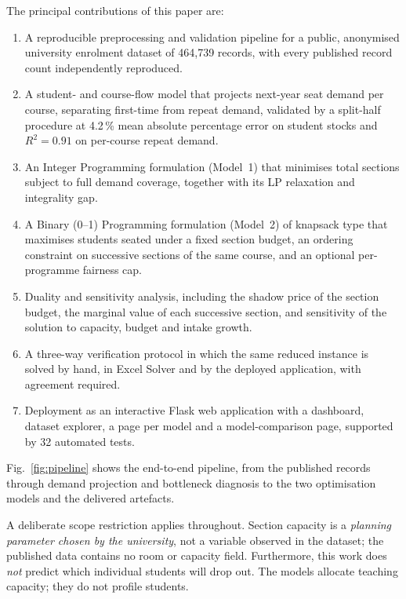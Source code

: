 \documentclass[conference]{IEEEtran}
\begin{document}
The principal contributions of this paper are:
\begin{enumerate}
\item A reproducible preprocessing and validation pipeline for a public, anonymised
      university enrolment dataset of 464{,}739 records, with every published record
      count independently reproduced.
\item A student- and course-flow model that projects next-year seat demand per course,
      separating first-time from repeat demand, validated by a split-half procedure at
      4.2\,\% mean absolute percentage error on student stocks and $R^2 = 0.91$ on
      per-course repeat demand.
\item An Integer Programming formulation (Model~1) that minimises total sections subject
      to full demand coverage, together with its LP relaxation and integrality gap.
\item A Binary (0--1) Programming formulation (Model~2) of knapsack type that maximises
      students seated under a fixed section budget, an ordering constraint on successive
      sections of the same course, and an optional per-programme fairness cap.
\item Duality and sensitivity analysis, including the shadow price of the section budget,
      the marginal value of each successive section, and sensitivity of the solution to
      capacity, budget and intake growth.
\item A three-way verification protocol in which the same reduced instance is solved by
      hand, in Excel Solver and by the deployed application, with agreement required.
\item Deployment as an interactive Flask web application with a dashboard, dataset
      explorer, a page per model and a model-comparison page, supported by 32 automated
      tests.
\end{enumerate}

Fig.~\ref{fig:pipeline} shows the end-to-end pipeline, from the published records through demand projection and bottleneck diagnosis to the two optimisation models and the delivered artefacts.

A deliberate scope restriction applies throughout. Section capacity is a
\emph{planning parameter chosen by the university}, not a variable observed in the
dataset; the published data contains no room or capacity field. Furthermore, this work
does \emph{not} predict which individual students will drop out. The models allocate
teaching capacity; they do not profile students.
\end{document}
